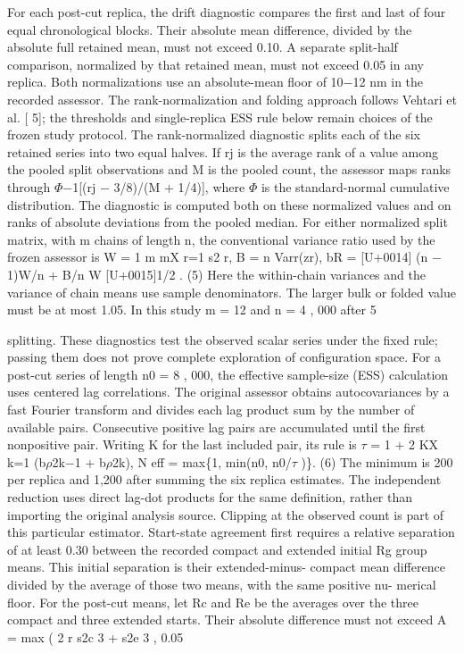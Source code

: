 \documentclass[11pt]{article}
\begin{document}
For each post-cut replica, the drift diagnostic compares the first and last of four equal chronological
blocks. Their absolute mean difference, divided by the absolute full retained mean, must not exceed
0.10. A separate split-half comparison, normalized by that retained mean, must not exceed 0.05 in
any replica. Both normalizations use an absolute-mean floor of 10\ensuremath{-}12 nm in the recorded assessor.
The rank-normalization and folding approach follows Vehtari et al. [ 5]; the thresholds and
single-replica ESS rule below remain choices of the frozen study protocol. The rank-normalized
diagnostic splits each of the six retained series into two equal halves. If rj is the average rank of
a value among the pooled split observations and M is the pooled count, the assessor maps ranks
through \ensuremath{\Phi}\ensuremath{-}1[(rj \ensuremath{-} 3/8)/(M + 1/4)], where \ensuremath{\Phi} is the standard-normal cumulative distribution. The
diagnostic is computed both on these normalized values and on ranks of absolute deviations from
the pooled median. For either normalized split matrix, with m chains of length n, the conventional
variance ratio used by the frozen assessor is
W = 1
m
mX
r=1
s2
r, B = n Varr(zr), bR =
[U+0014] (n \ensuremath{-} 1)W/n + B/n
W
[U+0015]1/2
. (5)
Here the within-chain variances and the variance of chain means use sample denominators. The
larger bulk or folded value must be at most 1.05. In this study m = 12 and n = 4 , 000 after
5

splitting. These diagnostics test the observed scalar series under the fixed rule; passing them does
not prove complete exploration of configuration space.
For a post-cut series of length n0 = 8 , 000, the effective sample-size (ESS) calculation uses
centered lag correlations. The original assessor obtains autocovariances by a fast Fourier transform
and divides each lag product sum by the number of available pairs. Consecutive positive lag pairs
are accumulated until the first nonpositive pair. Writing K for the last included pair, its rule is
\ensuremath{\tau} = 1 + 2
KX
k=1
(b\ensuremath{\rho}2k\ensuremath{-}1 + b\ensuremath{\rho}2k), N eff = max\{1, min(n0, n0/\ensuremath{\tau} )\}. (6)
The minimum is 200 per replica and 1,200 after summing the six replica estimates. The independent
reduction uses direct lag-dot products for the same definition, rather than importing the original
analysis source. Clipping at the observed count is part of this particular estimator.
Start-state agreement first requires a relative separation of at least 0.30 between the recorded
compact and extended initial Rg group means. This initial separation is their extended-minus-
compact mean difference divided by the average of those two means, with the same positive nu-
merical floor. For the post-cut means, let Rc and Re be the averages over the three compact and
three extended starts. Their absolute difference must not exceed
A = max
(
2
r
s2c
3 + s2e
3 , 0.05
\end{document}
